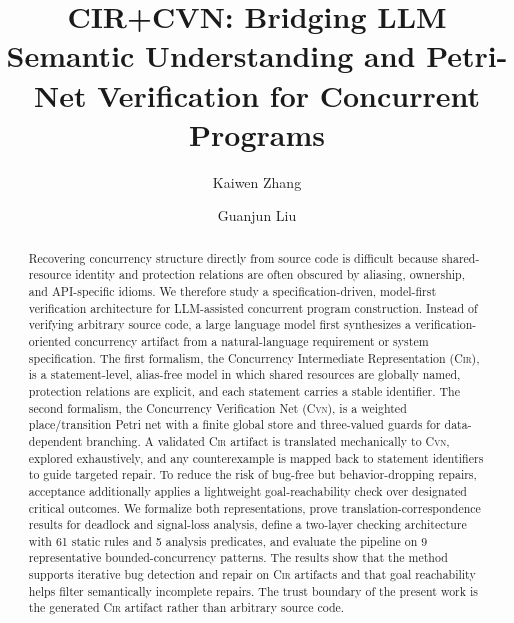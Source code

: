 \documentclass[sigconf]{acmart}
\begin{document}
\title[CIR+CVN for Concurrent Programs]{CIR+CVN: Bridging LLM Semantic Understanding and Petri-Net Verification for Concurrent Programs}

\author{Kaiwen Zhang}

\author{Guanjun Liu}


\begin{abstract}
Recovering concurrency structure directly from source code is difficult because shared-resource identity and protection relations are often obscured by aliasing, ownership, and API-specific idioms. We therefore study a specification-driven, model-first verification architecture for LLM-assisted concurrent program construction. Instead of verifying arbitrary source code, a large language model first synthesizes a verification-oriented concurrency artifact from a natural-language requirement or system specification. The first formalism, the Concurrency Intermediate Representation (\textsc{Cir}), is a statement-level, alias-free model in which shared resources are globally named, protection relations are explicit, and each statement carries a stable identifier. The second formalism, the Concurrency Verification Net (\textsc{Cvn}), is a weighted place/transition Petri net with a finite global store and three-valued guards for data-dependent branching. A validated \textsc{Cir} artifact is translated mechanically to \textsc{Cvn}, explored exhaustively, and any counterexample is mapped back to statement identifiers to guide targeted repair. To reduce the risk of bug-free but behavior-dropping repairs, acceptance additionally applies a lightweight goal-reachability check over designated critical outcomes. We formalize both representations, prove translation-correspondence results for deadlock and signal-loss analysis, define a two-layer checking architecture with 61 static rules and 5 analysis predicates, and evaluate the pipeline on 9 representative bounded-concurrency patterns. The results show that the method supports iterative bug detection and repair on \textsc{Cir} artifacts and that goal reachability helps filter semantically incomplete repairs. The trust boundary of the present work is the generated \textsc{Cir} artifact rather than arbitrary source code.
\end{abstract}


\end{document}
